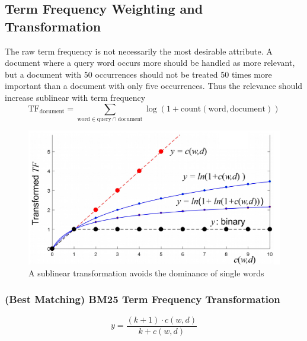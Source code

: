 \documentclass[11pt]{article}
\begin{document}
\subsection{Term Frequency Weighting and Transformation}
The raw term frequency is not necessarily the most desirable attribute. A document where a query word occurs more should be handled as more relevant, but a document with 50 occurrences should not be treated 50 times more important than a document with only five occurrences. Thus the relevance should increase sublinear with term frequency
\begin{equation*}
	\text{TF}_{\text{document}} = \underset{\text{word}\in\text{query}\cap\text{document}}{\sum}\log\left( 1 + \text{count}(\text{word},\text{document}) \right)
\end{equation*}
\begin{figure}[H]
	\centering
	\includegraphics[width=0.6\linewidth]{img/term_frequency_transformation}
	\caption{A sublinear transformation avoids the dominance of single words}
	\label{fig:termfrequencytransformation}
\end{figure}

\subsubsection{(Best Matching) BM25 Term Frequency Transformation}
\begin{equation*}
	y = \frac{(k+1)\cdot c(w,d)}{k+c(w,d)}
\end{equation*}
\end{document}
